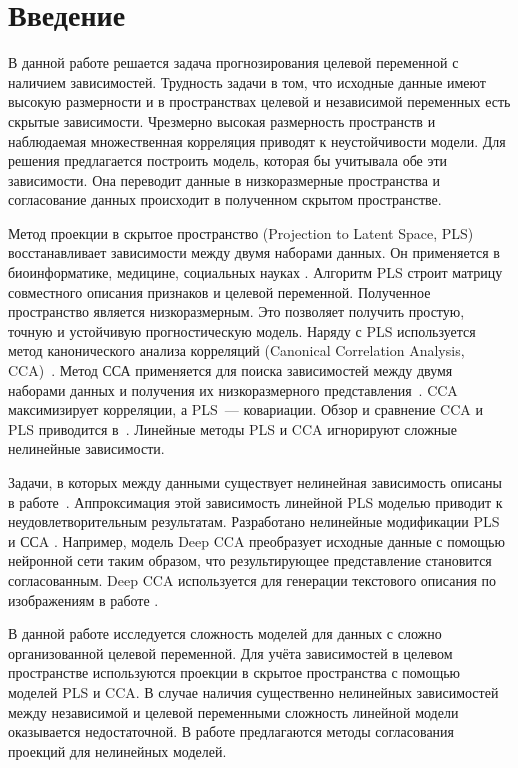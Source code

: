 \documentclass[12pt]{article}
\begin{document}
	
	\section{Введение}
	В данной работе решается задача прогнозирования целевой переменной с наличием зависимостей. Трудность задачи в том, что исходные данные имеют высокую размерности и в пространствах целевой и независимой переменных есть скрытые зависимости. Чрезмерно высокая размерность пространств и наблюдаемая множественная корреляция приводят к неустойчивости модели. Для решения предлагается построить модель, которая бы учитывала обе эти зависимости. Она переводит данные в низкоразмерные пространства и согласование данных происходит в полученном скрытом пространстве.
	
	Метод проекции в скрытое пространство (Projection to Latent Space, PLS)~\cite{overview_pls, overview_nonlinear_pls} восстанавливает зависимости между двумя наборами данных. Он применяется в биоинформатике, медицине, социальных науках \cite{1figures, btc519, PLS_in_strategic_management, PLS_application}. Алгоритм PLS строит матрицу совместного описания признаков и целевой переменной. Полученное пространство является низкоразмерным. Это позволяет получить простую, точную и устойчивую прогностическую модель. Наряду с PLS используется метод канонического анализа корреляций (Canonical Correlation Analysis, CCA)~\cite{cca_alg}. Метод ССА применяется для поиска зависимостей между двумя наборами данных и получения их низкоразмерного представления~\cite{cca_apl1, cca_apl2}. CCA максимизирует корреляции, а PLS~--- ковариации. Обзор и сравнение CCA и PLS приводится в~\cite{overview_pls}. Линейные методы PLS и CCA игнорируют сложные нелинейные зависимости. 
	
	Задачи, в которых между данными существует нелинейная зависимость описаны в работе~\cite{overview_nonlinear_pls}. Аппроксимация этой зависимость линейной PLS моделью приводит к неудовлетворительным результатам. Разработано нелинейные модификации PLS~\cite{PLS_nn, PLS_rbf, PLS_ga} и ССA \cite{deep_cca, kernel_cca}. Например, модель Deep CCA \cite{deep_cca} преобразует исходные данные с помощью нейронной сети таким образом, что результирующее представление становится согласованным. Deep CCA используется для генерации текстового описания по изображениям в работе \cite{kernel_cca_appl}. 
	
	В данной работе исследуется сложность моделей для данных с сложно организованной целевой переменной. 
	Для учёта зависимостей в целевом пространстве используются проекции в скрытое пространства с помощью моделей PLS и CCA.
	В случае наличия существенно нелинейных зависимостей между независимой и целевой переменными сложность линейной модели оказывается недостаточной.
	В работе предлагаются методы согласования проекций для нелинейных моделей.
	
\end{document}
